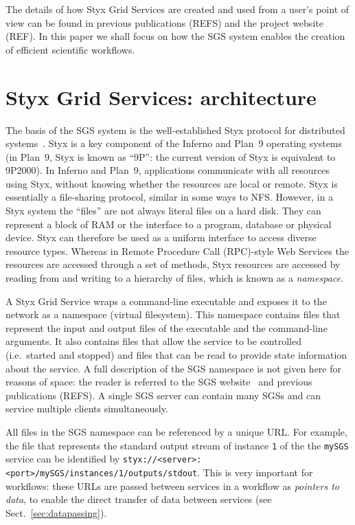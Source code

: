 \documentclass[a4paper]{article}
\begin{document}
The details of how Styx Grid Services are created and used from a user's point of view can be found in previous publications (REFS) and the project website (REF).  In this paper we shall focus on how the SGS system enables the creation of efficient scientific workflows. 

\section{Styx Grid Services: architecture}

The basis of the SGS system is the well-established Styx protocol for distributed systems~\cite{Pike:1999}.  Styx is a key component of the Inferno \cite{Inferno} and Plan~9 \cite{Plan9} operating systems (in Plan~9, Styx is known as ``9P'': the current version of Styx is equivalent to 9P2000).  In Inferno and Plan~9, applications communicate with all resources using Styx, without knowing whether the resources are local or remote.  Styx is essentially a file-sharing protocol, similar in some ways to NFS.  However, in a Styx system the ``files'' are not always literal files on a hard disk.  They can represent a block of RAM or the interface to a program, database or physical device.  Styx can therefore be used as a uniform interface to access diverse resource types.  Whereas in Remote Procedure Call (RPC)-style Web Services the resources are accessed through a set of methods, Styx resources are accessed by reading from and writing to a hierarchy of files, which is known as a \textit{namespace\/}.

A Styx Grid Service wraps a command-line executable and exposes it to the network as a namespace (virtual filesystem).  This namespace contains files that represent the input and output files of the executable and the command-line arguments.  It also contains files that allow the service to be controlled (i.e.\ started and stopped) and files that can be read to provide state information about the service.  A full description of the SGS namespace is not given here for reasons of space: the reader is referred to the SGS website~\cite{sgswebsite} and previous publications (REFS).  A single SGS server can contain many SGSs and can service multiple clients simultaneously.

All files in the SGS namespace can be referenced by a unique URL.  For example, the file that represents the standard output stream of instance \texttt{1} of the the \texttt{mySGS} service can be identified by \texttt{styx://<server>:<port>/mySGS/instances/1/outputs/stdout}.  This is very important for workflows: these URLs are passed between services in a workflow as \textit{pointers to data}, to enable the direct transfer of data between services (see Sect.~\ref{sec:datapassing}).
\end{document}
